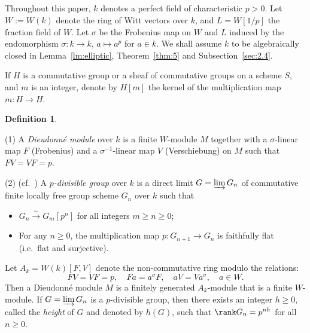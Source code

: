 \documentclass[]{amsart}
\theoremstyle{plain}
\theoremstyle{definition}
\newtheorem{defn}[thm]{Definition}
\theoremstyle{remark}
\newcommand{\<}{\langle}   %
\renewcommand{\>}{\rangle} %
\newcommand{\isoto}{\stackrel{\sim}{\longrightarrow}}
\newcommand{\dieu}{Dieudonn\'{e} }
\begin{document}
\subsection{} 
Throughout this paper, $k$ denotes a perfect field of characteristic $p>0$. Let $W:=W(k)$ denote the ring of Witt vectors over
$k$, and $L=W[1/p]$ the fraction field of $W$. 
Let $\sigma$ be the Frobenius map on $W$ and
$L$ induced by the endomorphism $\sigma:k \to k$, $a\mapsto a^p$ for $a\in k$. We shall assume $k$ to be algebraically closed in Lemma~\ref{lm:elliptic}, Theorem~\ref{thm:5} and Subsection~\ref{sec:2.4}.

If $H$ is a commutative group or a sheaf of commutative groups on a scheme $S$, and $m$ is an integer, denote by $H[m]$ the kernel of the multiplication map $m: H\to H$.

\begin{defn}\label{def:DM}

{\rm (1)} A \emph{\dieu module} over $k$ is a finite $W$-module $M$ together with a $\sigma$-linear map $F$ (Frobenius) and a
$\sigma^{-1}$-linear map $V$ (Verschiebung) on $M$ such that $F V=VF=p$.

{\rm (2)} (cf.~\cite[p.~45--46]{demazure}) A \emph{$p$-divisible group} over $k$ is a direct limit $G=\varinjlim G_n$ of commutative finite locally free group scheme $G_n$ over $k$ such that 
\begin{itemize}
    \item [(i)] $G_n \isoto G_m[p^n]$ for all integers $m\ge n\ge 0$; %
    \item[(ii)] For any $n\ge 0$, the multiplication map $p: G_{n+1} \to G_n$ is faithfully flat (i.e.~flat and surjective). 
\end{itemize}  
\end{defn}

Let $A_k=W(k)[F,V]$ denote the non-commutative ring modulo the relations:
\[ FV=VF=p, \quad F a = a^\sigma F, \quad a V=V a^{\sigma}, \quad  a\in W. \]
Then a \dieu module $M$ is a finitely generated $A_k$-module that is a finite $W$-module. If $G=\varinjlim G_n$ is a $p$-divisible group, then there exists an integer $h\ge 0$, called the \emph{height} of $G$ and denoted by $h(G)$, such that $\rank G_n=p^{nh}$ for all $n\ge 0$. \\
\end{document}
